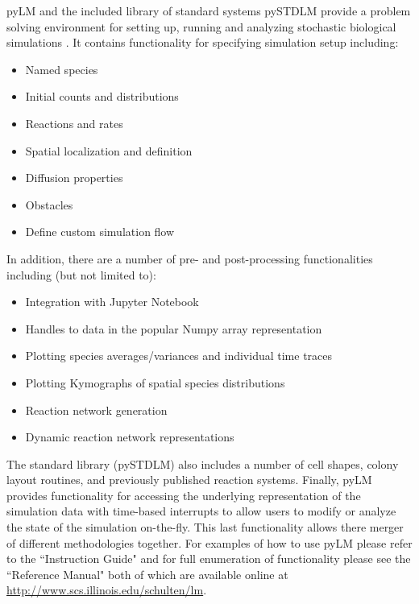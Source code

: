pyLM and the included library of standard systems pySTDLM provide a problem solving environment for setting up, running and analyzing stochastic biological simulations \cite{Peterson2013aps}.  It contains functionality for specifying simulation setup including:

\begin{itemize}
\item Named species
\item Initial counts and distributions 
\item Reactions and rates
\item Spatial localization and definition
\item Diffusion properties
\item Obstacles
\item Define custom simulation flow
\end{itemize}

In addition, there are a number of pre- and post-processing functionalities including (but not limited to):

\begin{itemize}
\item Integration with Jupyter Notebook
\item Handles to data in the popular Numpy array representation
\item Plotting species averages/variances and individual time traces
\item Plotting Kymographs of spatial species distributions
\item Reaction network generation
\item Dynamic reaction network representations
\end{itemize}

The standard library (pySTDLM) also includes a number of cell shapes, colony layout routines, and previously published reaction systems.  Finally, pyLM provides functionality for accessing the underlying representation of the simulation data with time-based interrupts to allow users to modify or analyze the state of the simulation on-the-fly.  This last functionality allows there merger of different methodologies together.  For examples of how to use pyLM please refer to the ``Instruction Guide" and for full enumeration of functionality please see the ``Reference Manual" both of which are available online at \url{http://www.scs.illinois.edu/schulten/lm}. 



